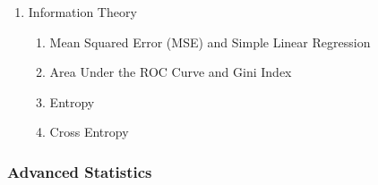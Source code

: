 \documentclass[8pt]{extarticle}
\begin{document}
\begin{enumerate}[label=\arabic*.]
\begin{enumerate}[label*=\arabic*.]
              \item Tensors
          \end{enumerate}
    \item Information Theory
          \begin{enumerate}[label*=\arabic*.]
              \item Mean Squared Error (MSE) and Simple Linear Regression
              \item Area Under the ROC Curve and Gini Index
              \item Entropy
              \item Cross Entropy
          \end{enumerate}
\end{enumerate}
\subsubsection{Advanced Statistics}
\end{document}
